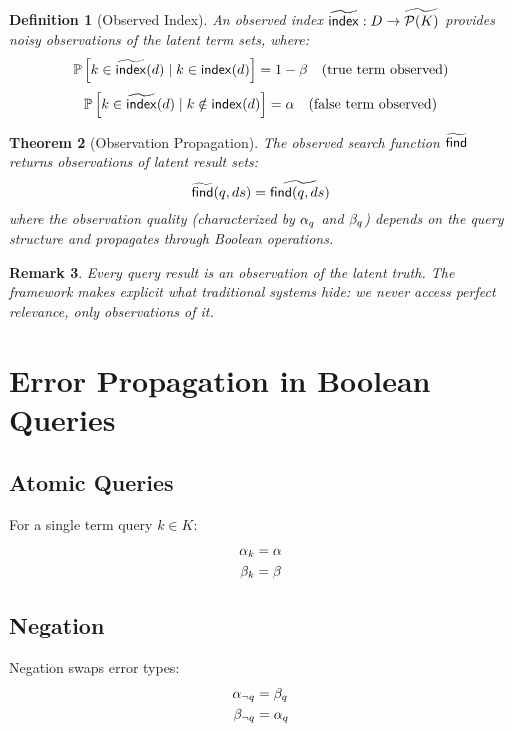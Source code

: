 \documentclass[11pt,final,hidelinks]{article}
\newtheorem{theorem}{Theorem}[section]
\newtheorem{definition}[theorem]{Definition}
\newtheorem{remark}[theorem]{Remark}
\newcommand{\Find}{\mathsf{find}}     %
\newcommand{\OFind}{\obs{\mathsf{find}}}  %
\newcommand{\MakeIndex}{\mathsf{index}}
\newcommand{\OMakeIndex}{\obs{\mathsf{index}}}
\begin{document}
\begin{definition}[Observed Index]
An observed index $\OMakeIndex : D \to \obs{\PS{K}}$ provides noisy observations of the latent term sets, where:
\begin{equation}
\ProbCond{k \in \OMakeIndex(d)}{k \in \MakeIndex(d)} = 1 - \fnrate \quad \text{(true term observed)}
\end{equation}
\begin{equation}
\ProbCond{k \in \OMakeIndex(d)}{k \notin \MakeIndex(d)} = \fprate \quad \text{(false term observed)}
\end{equation}
\end{definition}

\begin{theorem}[Observation Propagation]
The observed search function $\OFind$ returns observations of latent result sets:
\begin{equation}
\OFind(q, ds) = \obs{\Find(q, ds)}
\end{equation}
where the observation quality (characterized by $\alpha_q$ and $\beta_q$) depends on the query structure and propagates through Boolean operations.
\end{theorem}

\begin{remark}
Every query result is an observation of the latent truth. The framework makes explicit what traditional systems hide: we never access perfect relevance, only observations of it.
\end{remark}

\section{Error Propagation in Boolean Queries}

\subsection{Atomic Queries}

For a single term query $k \in K$:
\begin{align}
\alpha_k &= \alpha \\
\beta_k &= \beta
\end{align}

\subsection{Negation}

Negation swaps error types:
\begin{align}
\alpha_{\neg q} &= \beta_q \\
\beta_{\neg q} &= \alpha_q
\end{align}
\end{document}
